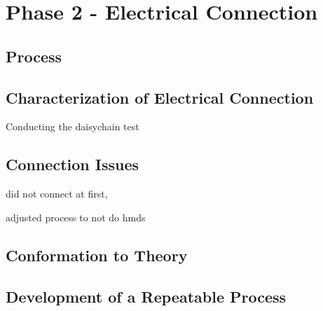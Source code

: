 \chapter{Phase 2 - Electrical Connection}
\label{sec:Ch3_elec}

\section{Process}

\section{Characterization of Electrical Connection}
Conducting the daisychain test

\section{Connection Issues}
did not connect at first,

adjusted process to not do hmds

\section{Conformation to Theory}
\section{Development of a Repeatable Process}
